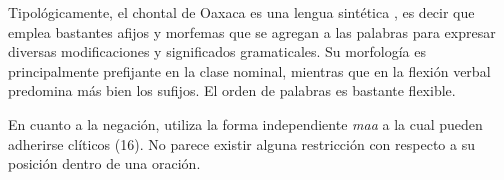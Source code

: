 Tipológicamente, el chontal de Oaxaca es una lengua sintética \textcolor{MidnightBlue}{\citep{ChontalOaxaca}}, es decir que emplea bastantes afijos y morfemas que se agregan a las palabras para expresar diversas modificaciones y significados gramaticales. Su morfología es principalmente prefijante en la clase nominal, mientras que en la flexión verbal predomina más bien los sufijos. El orden de palabras es bastante flexible.

En cuanto a la negación, utiliza la forma independiente \textit{maa} a la cual pueden adherirse clíticos (16). No parece existir alguna restricción con respecto a su posición dentro de una oración.
